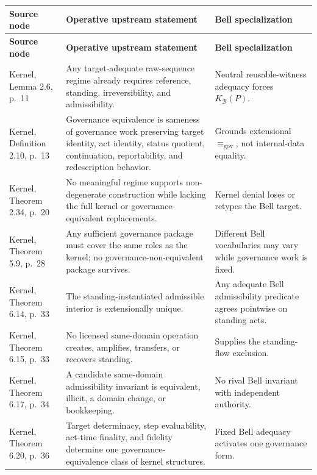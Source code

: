 \documentclass[11pt]{article}
\theoremstyle{definition}
\newcommand{\Bell}{\mathcal{B}}
\newcommand{\Kbell}{K_{\Bell}}
\newcommand{\GovEq}{\equiv_{\mathrm{gov}}}
\begin{document}
\scriptsize
\begin{longtable}{L{0.22\textwidth}L{0.38\textwidth}L{0.32\textwidth}}
\toprule
\textbf{Source node} & \textbf{Operative upstream statement} & \textbf{Bell specialization}\\
\midrule
\endfirsthead
\toprule
\textbf{Source node} & \textbf{Operative upstream statement} & \textbf{Bell specialization}\\
\midrule
\endhead
Kernel, Lemma 2.6, p.~11 \cite{MaleyKernel2026} & Any target-adequate raw-sequence regime already requires reference, standing, irreversibility, and admissibility. & Neutral reusable-witness adequacy forces $\Kbell(P)$.\\
Kernel, Definition 2.10, p.~13 \cite{MaleyKernel2026} & Governance equivalence is sameness of governance work preserving target identity, act identity, status quotient, continuation, reportability, and redescription behavior. & Grounds extensional $\GovEq$, not internal-data equality.\\
Kernel, Theorem 2.34, p.~20 \cite{MaleyKernel2026} & No meaningful regime supports non-degenerate construction while lacking the full kernel or governance-equivalent replacements. & Kernel denial loses or retypes the Bell target.\\
Kernel, Theorem 5.9, p.~28 \cite{MaleyKernel2026} & Any sufficient governance package must cover the same roles as the kernel; no governance-non-equivalent package survives. & Different Bell vocabularies may vary while governance work is fixed.\\
Kernel, Theorem 6.14, p.~33 \cite{MaleyKernel2026} & The standing-instantiated admissible interior is extensionally unique. & Any adequate Bell admissibility predicate agrees pointwise on standing acts.\\
Kernel, Theorem 6.15, p.~33 \cite{MaleyKernel2026} & No licensed same-domain operation creates, amplifies, transfers, or recovers standing. & Supplies the standing-flow exclusion.\\
Kernel, Theorem 6.17, p.~34 \cite{MaleyKernel2026} & A candidate same-domain admissibility invariant is equivalent, illicit, a domain change, or bookkeeping. & No rival Bell invariant with independent authority.\\
Kernel, Theorem 6.20, p.~36 \cite{MaleyKernel2026} & Target determinacy, step evaluability, act-time finality, and fidelity determine one governance-equivalence class of kernel structures. & Fixed Bell adequacy activates one governance form.\\

\end{longtable}
\end{document}
